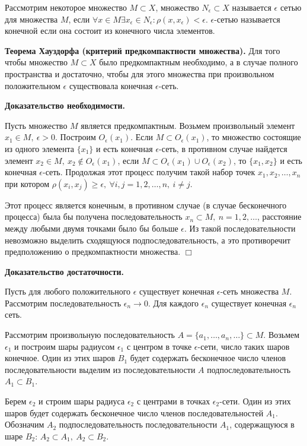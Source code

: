 \documentclass[12pt]{report}
\renewcommand{\[}{$\\\displaystyle}
\renewcommand{\]}{\\$}
\renewcommand{\[}{$\\\displaystyle}
\newcommand{\sep}{,\ }
\newcommand{\tth}[1][]{\textbf{Теорема#1.}}
\newcommand{\btev}[1][]{\textbf{Доказательство#1.}
}
\newcommand{\etev}{$\Box$}
\begin{document}
Рассмотрим некоторое множество $M\subset X$, множество $N_{\epsilon} \subset X$ называется $\epsilon$ сетью для множества $M$, если $\forall x \in M \exists x_{\epsilon} \in N_{\epsilon}: \rho(x,x_{\epsilon})<\epsilon$. $\epsilon$-сетью называется конечной если она состоит из конечного числа элементов.

\tth[ Хауздорфа (критерий предкомпактности множества)] Для того чтобы множество $M\subset X$ было предкомпактным необходимо, а в случае полного пространства и достаточно, чтобы для этого множества при произвольном положительном $\epsilon$ существовала конечная $\epsilon$-сеть.

\btev[ необходимости]
  Пусть множество $M$ является предкомпактным. Возьмем произвольный элемент $x_1 \in M\sep \epsilon > 0$.
  Построим $O_{\epsilon}(x_1)$. Если $M \subset O_{\epsilon}(x_1)$, то множество состоящие из одного элемента $\{x_1\}$ и есть конечная $\epsilon$-сеть, в противном случае найдется элемент $x_2 \in M\sep x_2 \not\in O_\epsilon(x_1)$, если $M\subset O_\epsilon(x_1)\cup O_\epsilon(x_2)$, то $\{x_1,x_2\}$ и есть конечная $\epsilon$-сеть. Продолжая этот процесс получим такой набор точек $x_1, x_2,\dots,x_n$ при котором $\rho(x_i,x_j)\geq \epsilon\sep \forall i,j=1,2,\dots,n\sep i\neq j$.

  Этот процесс является конечным, в противном случае (в случае бесконечного процесса) была бы получена последовательность ${x_n}\subset M\sep n=1,2,\dots$, расстояние между любыми двумя точками было бы больше $\epsilon$. Из такой последовательности невозможно выделить сходящуюся подпоследовательность, а это противоречит предположению о предкомпактности множества.
\etev

\btev[ достаточности]
  Пусть для любого положительного $\epsilon$ существует конечная $\epsilon$-сеть множества $M$. Рассмотрим последовательность $\epsilon_n \rightarrow 0$. Для каждого $\epsilon_n$ существует конечная $\epsilon_n$ сеть.

  Рассмотрим произвольную последовательность $A=\{a_{1},\dots,a_n,\dots\}\subset M$. Возьмем $\epsilon_1$ и построим шары радиусом $\epsilon_1$ с центром в точке $\epsilon$-сети, число таких шаров конечное. Один из этих шаров $B_1$ будет содержать бесконечное число членов последовательности выделим из последовательности $A$ подпоследовательность $A_1\subset B_1$.

  Берем $\epsilon_2$ и строим шары радиуса $\epsilon_2$ с центрами в точках $\epsilon_2$-сети. Один из этих шаров будет содержать бесконечное число членов последовательностей $A_1$. Обозначим $A_2$ подпоследовательность последовательности $A_1$, содержащуюся в шаре $B_2$: $A_2\subset A_1\sep A_2\subset B_2$.
\end{document}

